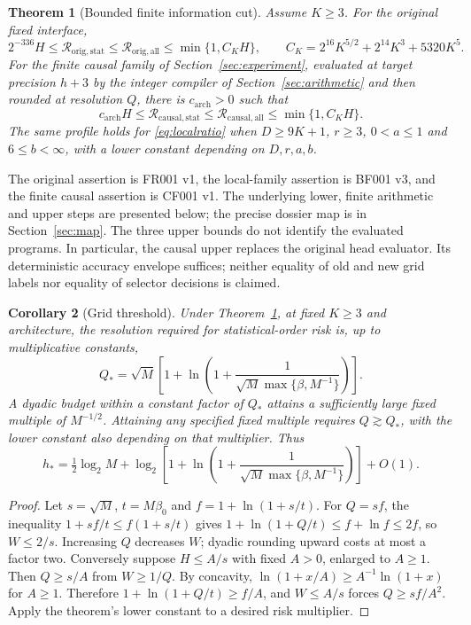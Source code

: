 \documentclass[11pt,letterpaper]{article}
\newtheorem{theorem}{Theorem}[section]
\newtheorem{corollary}[theorem]{Corollary}
\theoremstyle{definition}\newtheorem{definition}[theorem]{Definition}
\theoremstyle{remark}\newtheorem{remark}[theorem]{Remark}
\newcommand{\betaz}{\beta_0}
\newcommand{\Risk}{\mathcal{R}}
\newcommand{\unit}[1]{\textsf{#1}}
\begin{document}
\begin{theorem}[Bounded finite information cut]\label{thm:main}
Assume $K\ge3$. For the original fixed interface,
\begin{equation}\label{eq:original}
 2^{-336}H\le\Risk_{\mathrm{orig},\mathrm{stat}}
 \le\Risk_{\mathrm{orig},\mathrm{all}}\le\min\{1,C_KH\},
 \qquad C_K=2^{16}K^{5/2}+2^{14}K^3+5320K^5.
\end{equation}
For the finite causal family of Section~\ref{sec:experiment}, evaluated at target precision $h+3$ by the integer compiler of Section~\ref{sec:arithmetic} and then rounded at resolution $Q$, there is $c_{\mathrm{arch}}>0$ such that
\begin{equation}\label{eq:causalmain}
 c_{\mathrm{arch}}H\le\Risk_{\mathrm{causal},\mathrm{stat}}
 \le\Risk_{\mathrm{causal},\mathrm{all}}\le\min\{1,C_KH\}.
\end{equation}
The same profile holds for \eqref{eq:localratio} when $D\ge9K+1$, $r\ge3$, $0<a\le1$ and $6\le b<\infty$, with a lower constant depending on $D,r,a,b$.
\end{theorem}

The original assertion is \unit{FR001 v1}, the local-family assertion is \unit{BF001 v3}, and the finite causal assertion is \unit{CF001 v1}. The underlying lower, finite arithmetic and upper steps are presented below; the precise dossier map is in Section~\ref{sec:map}. The three upper bounds do not identify the evaluated programs. In particular, the causal upper replaces the original head evaluator. Its deterministic accuracy envelope suffices; neither equality of old and new grid labels nor equality of selector decisions is claimed.

\begin{corollary}[Grid threshold]\label{cor:threshold}
Under Theorem~\ref{thm:main}, at fixed $K\ge3$ and architecture, the resolution required for statistical-order risk is, up to multiplicative constants,
\begin{equation}\label{eq:qstar}
 Q_* =\sqrt M\left[1+\ln\left(1+\frac1{\sqrt M\max\{\beta,M^{-1}\}}\right)\right].
\end{equation}
A dyadic budget within a constant factor of $Q_*$ attains a sufficiently large fixed multiple of $M^{-1/2}$. Attaining any specified fixed multiple requires $Q\gtrsim Q_*$, with the lower constant also depending on that multiplier. Thus
\[
 h_* =\tfrac12\log_2M+
 \log_2\left[1+\ln\left(1+\frac1{\sqrt M\max\{\beta,M^{-1}\}}\right)\right]+O(1).
\]
\end{corollary}
\begin{proof}
Let $s=\sqrt M$, $t=M\betaz$ and $f=1+\ln(1+s/t)$. For $Q=sf$, the inequality $1+sf/t\le f(1+s/t)$ gives $1+\ln(1+Q/t)\le f+\ln f\le2f$, so $W\le2/s$. Increasing $Q$ decreases $W$; dyadic rounding upward costs at most a factor two.
Conversely suppose $H\le A/s$ with fixed $A>0$, enlarged to $A\ge1$. Then $Q\ge s/A$ from $W\ge1/Q$. By concavity, $\ln(1+x/A)\ge A^{-1}\ln(1+x)$ for $A\ge1$. Therefore $1+\ln(1+Q/t)\ge f/A$, and $W\le A/s$ forces $Q\ge sf/A^2$. Apply the theorem's lower constant to a desired risk multiplier.
\end{proof}
\end{document}
